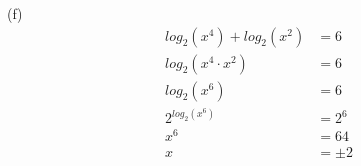 \begin{exercise}
	(f)
	\begin{align}
		log_2(x^4) + log_2(x^2) & = 6     \\
		log_2(x^4 \cdot x^2)    & = 6     \\
		log_2(x^6)              & = 6     \\
		2^{log_2(x^6)}          & = 2^6   \\
		x^6                     & = 64    \\
		x                       & = \pm 2
	\end{align}
\end{exercise}